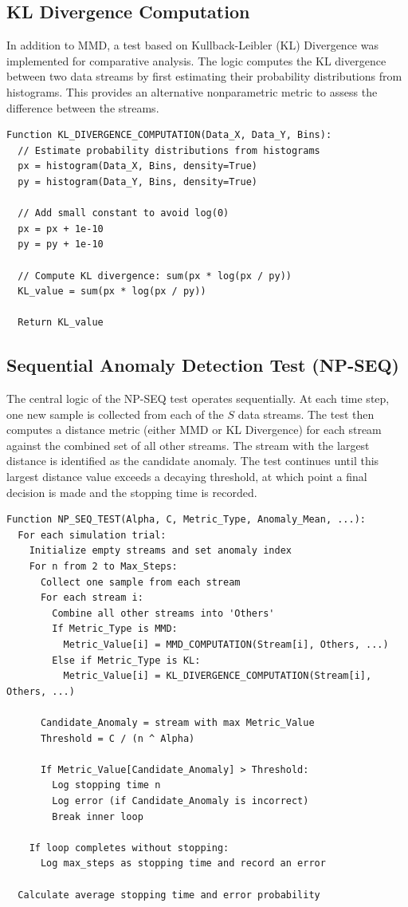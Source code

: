 \subsection{KL Divergence Computation}
In addition to MMD, a test based on Kullback-Leibler (KL) Divergence was implemented for comparative analysis. The logic computes the KL divergence between two data streams by first estimating their probability distributions from histograms. This provides an alternative nonparametric metric to assess the difference between the streams.
\begin{verbatim}
Function KL_DIVERGENCE_COMPUTATION(Data_X, Data_Y, Bins):
  // Estimate probability distributions from histograms
  px = histogram(Data_X, Bins, density=True)
  py = histogram(Data_Y, Bins, density=True)
  
  // Add small constant to avoid log(0)
  px = px + 1e-10
  py = py + 1e-10
  
  // Compute KL divergence: sum(px * log(px / py))
  KL_value = sum(px * log(px / py))
  
  Return KL_value
\end{verbatim}

\subsection{Sequential Anomaly Detection Test (NP-SEQ)}
The central logic of the NP-SEQ test operates sequentially. At each time step, one new sample is collected from each of the $S$ data streams. The test then computes a distance metric (either MMD or KL Divergence) for each stream against the combined set of all other streams. The stream with the largest distance is identified as the candidate anomaly. The test continues until this largest distance value exceeds a decaying threshold, at which point a final decision is made and the stopping time is recorded.
\begin{verbatim}
Function NP_SEQ_TEST(Alpha, C, Metric_Type, Anomaly_Mean, ...):
  For each simulation trial:
    Initialize empty streams and set anomaly index
    For n from 2 to Max_Steps:
      Collect one sample from each stream
      For each stream i:
        Combine all other streams into 'Others'
        If Metric_Type is MMD:
          Metric_Value[i] = MMD_COMPUTATION(Stream[i], Others, ...)
        Else if Metric_Type is KL:
          Metric_Value[i] = KL_DIVERGENCE_COMPUTATION(Stream[i], Others, ...)
      
      Candidate_Anomaly = stream with max Metric_Value
      Threshold = C / (n ^ Alpha)
      
      If Metric_Value[Candidate_Anomaly] > Threshold:
        Log stopping time n
        Log error (if Candidate_Anomaly is incorrect)
        Break inner loop
    
    If loop completes without stopping:
      Log max_steps as stopping time and record an error
  
  Calculate average stopping time and error probability
\end{verbatim}

